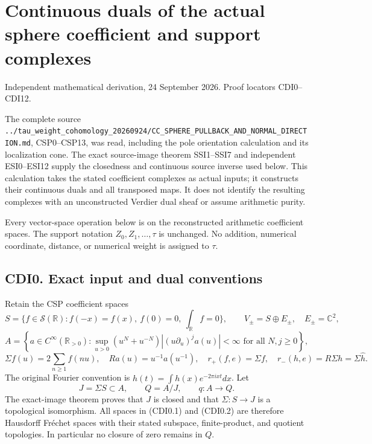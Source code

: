 \section{Continuous duals of the actual sphere coefficient and support
complexes}\label{continuous-duals-of-the-actual-sphere-coefficient-and-support-complexes}

Independent mathematical derivation, 24 September 2026. Proof locators
CDI0--CDI12.

The complete source
\nolinkurl{../tau_weight_cohomology_20260924/CC_SPHERE_PULLBACK_AND_NORMAL_DIRECTION.md},
CSP0--CSP13, was read, including the pole orientation calculation and
its localization cone. The exact source-image theorem SSI1--SSI7 and
independent ESI0--ESI12 supply the closedness and continuous source
inverse used below. This calculation takes the stated coefficient
complexes as actual inputs; it constructs their continuous duals and all
transposed maps. It does not identify the resulting complexes with an
unconstructed Verdier dual sheaf or assume arithmetic purity.

Every vector-space operation below is on the reconstructed arithmetic
coefficient spaces. The support notation \(Z_0,Z_1,\ldots,\tau\) is
unchanged. No addition, numerical coordinate, distance, or numerical
weight is assigned to \(\tau\).

\subsection{CDI0. Exact input and dual
conventions}\label{cdi0.-exact-input-and-dual-conventions}

Retain the CSP coefficient spaces \[
S=\{f\in\mathcal S(\mathbb R):f(-x)=f(x),\ f(0)=0,\ \int_{\mathbb R}f=0\},
\qquad V_\pm=S\oplus E_\pm,\quad E_\pm=\mathbb C^2,
\] \[
A=\left\{a\in C^\infty(\mathbb R_{>0}):
\sup_{u>0}(u^N+u^{-N})|(u\partial_u)^ja(u)|<\infty
\text{ for all }N,j\ge0\right\},
\] \[
\Sigma f(u)=2\sum_{n\ge1}f(nu),\quad Ra(u)=u^{-1}a(u^{-1}),
\quad r_+(f,e)=\Sigma f,\quad r_-(h,e)=R\Sigma h=\Sigma\widehat h.
\tag{CDI0.1}
\] The original Fourier convention is
\(\widehat h(t)=\int h(x)e^{-2\pi ixt}dx\). Let \[
J=\Sigma S\subset A,\qquad Q=A/J,\qquad q:A\to Q.
\tag{CDI0.2}
\] The exact-image theorem proves that \(J\) is closed and that
\(\Sigma:S\to J\) is a topological isomorphism. All spaces in (CDI0.1)
and (CDI0.2) are therefore Hausdorff Fréchet spaces with their stated
subspace, finite-product, and quotient topologies. In particular no
closure of zero remains in \(Q\).

